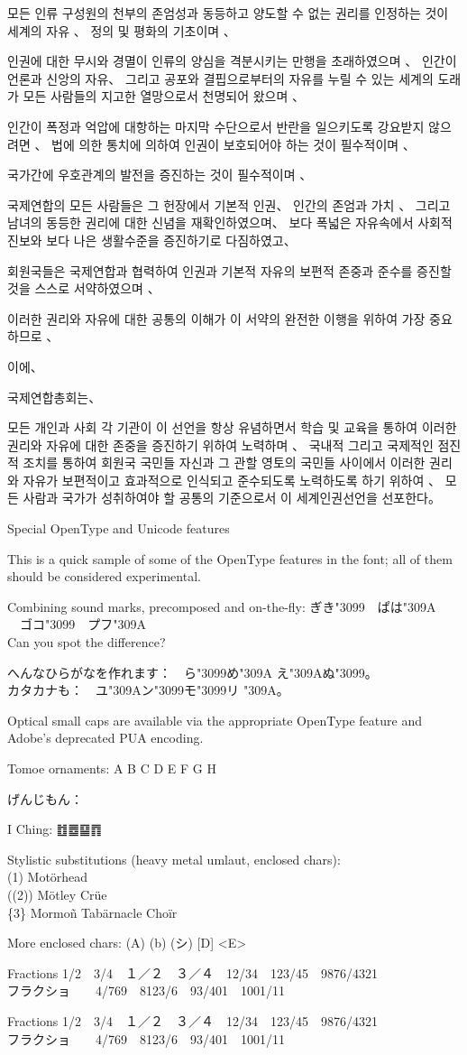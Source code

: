 \documentclass[14pt]{extarticle}
\newcommand{\undecl}{%
모든 인류 구성원의 천부의 존엄성과 동등하고 양도할 수 없는 권리를 인정하는
것이 세계의 자유 、 정의 및 평화의 기초이며 、

인권에 대한 무시와 경멸이 인류의 양심을 격분시키는 만행을 초래하였으며 、
인간이 언론과 신앙의 자유、 그리고 공포와 결핍으로부터의 자유를 누릴 수 있는
세계의 도래가 모든 사람들의 지고한 열망으로서 천명되어 왔으며 、

인간이 폭정과 억압에 대항하는 마지막 수단으로서 반란을 일으키도록 강요받지
않으려면 、 법에 의한 통치에 의하여 인권이 보호되어야 하는 것이 필수적이며 、

국가간에 우호관계의 발전을 증진하는 것이 필수적이며 、

국제연합의 모든 사람들은 그 헌장에서 기본적 인권、 인간의 존엄과 가치 、
그리고 남녀의 동등한 권리에 대한 신념을 재확인하였으며、 보다 폭넓은
자유속에서 사회적 진보와 보다 나은 생활수준을 증진하기로 다짐하였고、

회원국들은 국제연합과 협력하여 인권과 기본적 자유의 보편적 존중과 준수를
증진할 것을 스스로 서약하였으며 、

이러한 권리와 자유에 대한 공통의 이해가 이 서약의 완전한 이행을 위하여 가장
중요하므로 、

이에、

국제연합총회는、

모든 개인과 사회 각 기관이 이 선언을 항상 유념하면서 학습 및 교육을 통하여
이러한 권리와 자유에 대한 존중을 증진하기 위하여 노력하며 、 국내적 그리고
국제적인 점진적 조치를 통하여 회원국 국민들 자신과 그 관할 영토의 국민들
사이에서 이러한 권리와 자유가 보편적이고 효과적으로 인식되고 준수되도록
노력하도록 하기 위하여 、 모든 사람과 국가가 성취하여야 할 공통의 기준으로서
이 세계인권선언을 선포한다。 
\par
}
\begin{document}
\undecl

\clearpage

\fi


\kaku

\Large
Special OpenType and Unicode features

\normalsize

This is a quick sample of some of the OpenType features in the font; all of
them should be considered experimental.

Combining sound marks, precomposed and
on-the-fly:  {\kakumono ぎき{\char"3099}~~ぱは{\char"309A}%
~~ゴコ{\char"3099}~~プフ{\char"309A}}\\
Can you spot the difference?

へんなひらがなを作れます：~~{\kakumono ら{\char"3099}め{\char"309A}%
え{\char"309A}ぬ{\char"3099}}。\\
カタカナも：~~{\kakumono ユ{\char"309A}ン{\char"3099}モ{\char"3099}リ%
{\char"309A}}。

{
Optical small caps are available via the appropriate OpenType feature and
Adobe's deprecated PUA encoding.
}

{
Tomoe ornaments: \Large A B C D E F G H
}

げんじもん：{\Large 󱟁󱟆󱟓󱟢}

I Ching: {\Large ䷂䷉䷙䷓}

{
Stylistic substitutions (heavy metal umlaut, enclosed chars):\\
 (1) Motörhead\\
 ((2)) Mötley Crüe\\
 \{3\} Mormoñ Tabärnacle Choïr}

{
More enclosed chars: (A) (b) (シ) [D] <E>}

{
Fractions 1/2~~3/4~~１／２~~３／４~~12/34~~123/45~~9876/4321\\
フラクショ~~~~4/769~~8123/6~~93/401~~1001/11
}

{
Fractions 1/2~~3/4~~１／２~~３／４~~12/34~~123/45~~9876/4321\\
フラクショ~~~~4/769~~8123/6~~93/401~~1001/11
}

\clearpage
\end{document}
